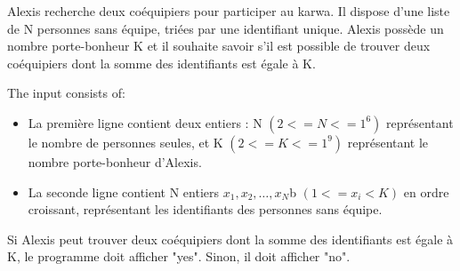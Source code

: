 \problemname{\problemyamlname}


\newcommand{\maxa}{123456789}

Alexis recherche deux coéquipiers pour participer au karwa. Il dispose d'une liste de N personnes sans équipe, triées par une identifiant unique. 
Alexis possède un nombre porte-bonheur K et il souhaite savoir s'il est possible de trouver deux coéquipiers dont la somme des identifiants est égale à K.


\begin{Input}
    The input consists of:
    \begin{itemize}
        \item La première ligne contient deux entiers : N $(2 <= N <= 1^6)$ représentant le nombre de personnes seules, et K $(2 <= K <= 1^9)$ représentant le nombre porte-bonheur d'Alexis.
        \item La seconde ligne contient N entiers $x_1, x_2, \dots, x_N$b $(1 <= x_i < K)$ en ordre croissant, représentant les identifiants des personnes sans équipe.
    \end{itemize}
\end{Input}

\begin{Output}
    Si Alexis peut trouver deux coéquipiers dont la somme des identifiants est égale à K, le programme doit afficher "yes". Sinon, il doit afficher "no".
\end{Output}
